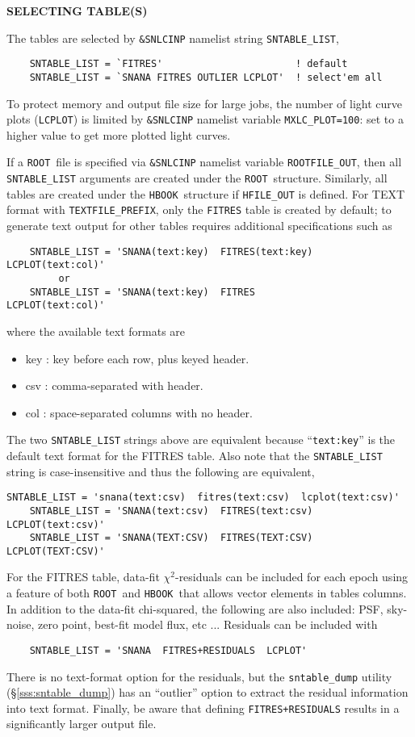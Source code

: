 \documentclass[12pt]{article}
\newcommand{\ROOT}{{\tt ROOT}}
\newcommand{\HBOOK}{{\tt HBOOK}}
\begin{document}
{\bigskip\centerline{\bf\large SELECTING TABLE(S) }
\medskip

The tables are selected by {\tt \&SNLCINP} namelist string
{\tt SNTABLE\_LIST},
\begin{verbatim}
    SNTABLE_LIST = `FITRES'                       ! default
    SNTABLE_LIST = `SNANA FITRES OUTLIER LCPLOT'  ! select'em all
\end{verbatim}
%
To protect memory and output file size for large jobs,
the number of light curve plots ({\tt LCPLOT})
is limited by {\tt \&SNLCINP} namelist variable
{\tt MXLC\_PLOT=100}: set to a higher value to get 
more plotted light curves.

If a \ROOT\ file is specified via {\tt \&SNLCINP} namelist
variable {\tt ROOTFILE\_OUT}, then all {\tt SNTABLE\_LIST} arguments 
are created under the \ROOT\ structure. Similarly, 
all tables are created under the \HBOOK\ structure if
{\tt HFILE\_OUT} is defined. 
For TEXT format with {\tt TEXTFILE\_PREFIX}, only the {\tt FITRES}
table is created by default; 
to generate text output for other tables requires
additional specifications such as
%
\begin{verbatim}
    SNTABLE_LIST = 'SNANA(text:key)  FITRES(text:key)  LCPLOT(text:col)'
         or
    SNTABLE_LIST = 'SNANA(text:key)  FITRES            LCPLOT(text:col)'
\end{verbatim}
%
where the available text formats are 
\begin{itemize}[noitemsep]
  \item  key : key before each row, plus keyed header.
  \item  csv : comma-separated with header.
  \item  col : space-separated columns with no header.
\end{itemize}
%
The two {\tt SNTABLE\_LIST} strings above are equivalent because 
``{\tt text:key}'' is the default text format for the FITRES table.
Also note that the {\tt SNTABLE\_LIST} string is case-insensitive
and thus the following are equivalent,
%
\begin{Verbatim}[frame=single]
    SNTABLE_LIST = 'snana(text:csv)  fitres(text:csv)  lcplot(text:csv)'
    SNTABLE_LIST = 'SNANA(text:csv)  FITRES(text:csv)  LCPLOT(text:csv)'
    SNTABLE_LIST = 'SNANA(TEXT:CSV)  FITRES(TEXT:CSV)  LCPLOT(TEXT:CSV)'
\end{Verbatim}


For the FITRES table, data-fit $\chi^2$-residuals can be included 
for each epoch using a feature of both \ROOT\ and \HBOOK\ that allows
vector elements in tables columns. In addition to the data-fit
chi-squared, the following are also included: PSF, sky-noise,
zero point, best-fit model flux, etc ... Residuals can be
included with
\begin{verbatim}
    SNTABLE_LIST = 'SNANA  FITRES+RESIDUALS  LCPLOT'
\end{verbatim}
There is no text-format option for the residuals,
but the {\tt sntable\_dump} utility (\S\ref{sss:sntable_dump})
has an ``outlier'' option to extract the residual information
into text format. Finally, be aware that defining {\tt FITRES+RESIDUALS}
results in a significantly larger output file.

}
\end{document}
